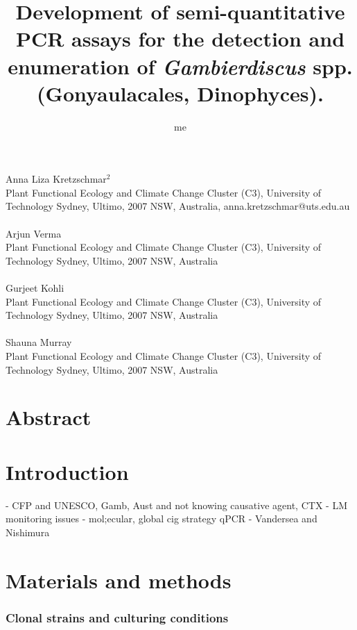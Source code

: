 \documentclass[12pt]{article}
\title{Development of semi-quantitative PCR assays for the detection and enumeration of \emph{Gambierdiscus} spp. (Gonyaulacales, Dinophyces).}
\author{me}
\date{}
\begin{document}
\maketitle
\paragraph{}Anna Liza Kretzschmar$^{2}$\\
Plant Functional Ecology and Climate Change Cluster (C3), University of Technology Sydney, Ultimo, 2007 NSW, Australia, anna.kretzschmar@uts.edu.au
\paragraph{}Arjun Verma \\
Plant Functional Ecology and Climate Change Cluster (C3), University of Technology Sydney, Ultimo, 2007 NSW, Australia
\paragraph{}Gurjeet Kohli\\ 
Plant Functional Ecology and Climate Change Cluster (C3), University of Technology Sydney, Ultimo, 2007 NSW, Australia
\paragraph{}Shauna Murray\\ 
Plant Functional Ecology and Climate Change Cluster (C3), University of Technology Sydney, Ultimo, 2007 NSW, Australia
\newpage
\section{Abstract}

\section{Introduction}
- CFP and UNESCO, Gamb, Aust and not knowing causative agent, CTX
- LM monitoring issues - mol;ecular, global cig strategy qPCR
- Vandersea and Nishimura

\section{Materials and methods}
\subsubsection{Clonal strains and culturing conditions}
\end{document}
